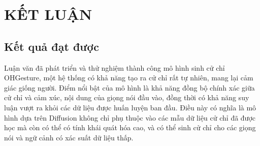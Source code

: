 \chapter{KẾT LUẬN}
\label{Chapter5}

\section{Kết quả đạt được}

%
%

Luận văn đã phát triển và thử nghiệm thành công mô hình sinh cử chỉ OHGesture, một hệ thống có khả năng tạo ra cử chỉ rất tự nhiên, mang lại cảm giác giống người. Điểm nổi bật của mô hình là khả năng đồng bộ chính xác giữa cử chỉ và cảm xúc, nội dung của giọng nói đầu vào, đồng thời có khả năng suy luận vượt ra khỏi các dữ liệu được huấn luyện ban đầu. Điều này có nghĩa là mô hình dựa trên Diffusion không chỉ phụ thuộc vào các mẫu dữ liệu cử chỉ đã được học mà còn có thể có tính khái quát hóa cao, và có thể sinh cử chỉ cho các giọng nói và ngữ cảnh có xác suất dữ liệu thấp.


